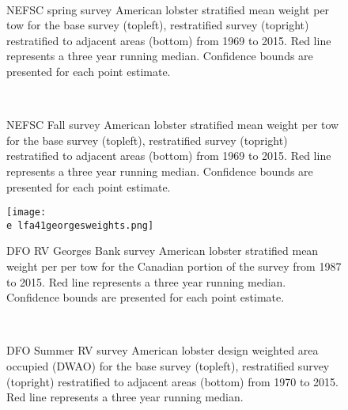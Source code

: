 \documentclass[11pt]{article}
\newcommand{\e}{/backup/bio_data/bio.lobster/figures/}
\begin{document}
\begin{figure}
\centering
{}
\\
\caption{NEFSC spring survey American lobster stratified mean weight per tow for the base survey (topleft), restratified survey (topright) restratified to adjacent areas (bottom) from 1969 to 2015. Red line represents a three year running median. Confidence bounds are presented for each point estimate. }
\end{figure}
\clearpage



\begin{figure}
\centering
{}
\\
\caption{NEFSC Fall survey American lobster stratified mean weight per tow for the base survey (topleft), restratified survey (topright) restratified to adjacent areas (bottom) from 1969 to 2015. Red line represents a three year running median. Confidence bounds are presented for each point estimate. }
\end{figure}
\clearpage


\begin{figure}

    \texttt{[image: \\e lfa41georgesweights.png]}
    \caption{DFO RV Georges Bank survey American lobster stratified mean weight per per tow for the Canadian portion of the survey from 1987 to 2015. Red line represents a three year running median. Confidence bounds are presented for each point estimate.}

\end{figure}


\begin{figure}
\centering
{}
\\
\caption{DFO Summer RV survey American lobster design weighted area occupied (DWAO) for the base survey (topleft), restratified survey (topright) restratified to adjacent areas (bottom) from 1970 to 2015. Red line represents a three year running median.}
\end{figure}
\clearpage
\end{document}
